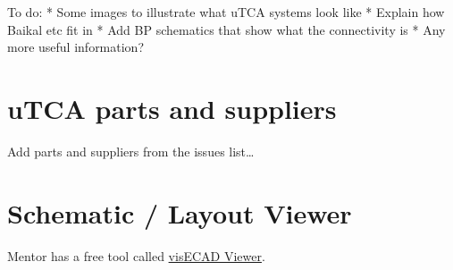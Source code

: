 To do: * Some images to illustrate what uTCA systems look like * Explain
how Baikal etc fit in * Add BP schematics that show what the
connectivity is * Any more useful information?

\section{uTCA parts and suppliers}\label{utca-parts-and-suppliers}

Add parts and suppliers from the issues list\ldots{}

\section{Schematic / Layout Viewer}\label{schematic-layout-viewer}

Mentor has a free tool called
\href{https://www.mentor.com/pcb/downloads/visecad-viewer/}{visECAD
Viewer}.
